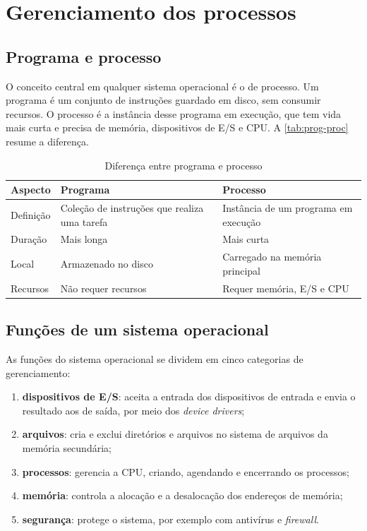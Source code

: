 \chapter{Gerenciamento dos processos}\label{cap:processos}

\section{Programa e processo}\label{sec:programa-processo}
O conceito central em qualquer sistema operacional é o de processo. Um programa é um conjunto de instruções guardado em disco, sem consumir recursos. O processo é a instância desse programa em execução, que tem vida mais curta e precisa de memória, dispositivos de E/S e CPU. A \autoref{tab:prog-proc} resume a diferença.

\begin{table}[H]
  \centering
  \caption{Diferença entre programa e processo}\label{tab:prog-proc}
  \begin{tabularx}{\linewidth}{lXX}
    \toprule
    \textbf{Aspecto} & \textbf{Programa} & \textbf{Processo} \\
    \midrule
    Definição & Coleção de instruções que realiza uma tarefa & Instância de um programa em execução \\
    Duração & Mais longa & Mais curta \\
    Local & Armazenado no disco & Carregado na memória principal \\
    Recursos & Não requer recursos & Requer memória, E/S e CPU \\
    \bottomrule
  \end{tabularx}
\end{table}

\section{Funções de um sistema operacional}

As funções do sistema operacional se dividem em cinco categorias de gerenciamento:

\begin{enumerate}
  \item \textbf{dispositivos de E/S}: aceita a entrada dos dispositivos de entrada e envia o resultado aos de saída, por meio dos \textit{device drivers};
  
  \item \textbf{arquivos}: cria e exclui diretórios e arquivos no sistema de arquivos da memória secundária;
  
  \item \textbf{processos}: gerencia a CPU, criando, agendando e encerrando os processos;
  
  \item \textbf{memória}: controla a alocação e a desalocação dos endereços de memória;
  
  \item \textbf{segurança}: protege o sistema, por exemplo com antivírus e \textit{firewall}.
  
\end{enumerate}

